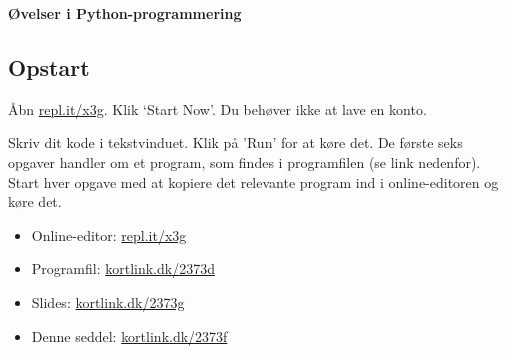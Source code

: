 \documentclass[12pt]{article}
\begin{document}
\centerline{\LARGE\bf Øvelser i Python-programmering}

\subsection*{Opstart}

Åbn \url{repl.it/x3g}. Klik `Start Now'. Du behøver ikke at lave en konto.


Skriv dit kode i tekstvinduet. Klik på 'Run' for at køre det.
De første seks opgaver handler om et program, som findes i
programfilen (se link nedenfor). Start hver opgave med at kopiere det relevante program ind i
online-editoren og køre det.

\begin{itemize}
\item Online-editor: \url{repl.it/x3g}
\item Programfil: \url{kortlink.dk/2373d}
\item Slides: \url{kortlink.dk/2373g}
\item Denne seddel: \url{kortlink.dk/2373f}
\end{itemize}
\end{document}
